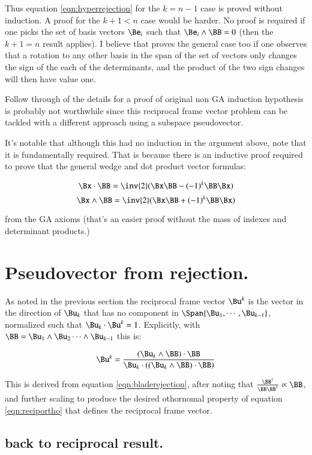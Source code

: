 \documentclass{article}      %
\begin{document}
Thus equation \ref{eqn:hyperrejection} for the $k = n-1$ case is proved without induction.  A proof for the $k+1<n$ case would be harder.
No proof is required if one picks the set of basis vectors ${\Be_i}$ such that $\Be_i \wedge \BB = 0$ (then the $k+1=n$ result applies).
I believe that proves the general case too if one observes that a rotation to any other basis in the span of the set of vectors only
changes the sign of the each of the determinants, and the product of the two sign changes will then have value one.

Follow through of the details for a proof of original non GA induction hypothesis is probably not worthwhile since this
reciprocal frame vector problem can be
tackled with a different approach using a subspace pseudovector.

It's notable that although this had no induction in the argument above, note that it is fundamentally required.
That is because there is an inductive proof
required to prove that the general wedge and dot product vector formulas:

\[
\Bx \cdot \BB = \inv{2}(\Bx \BB - (-1)^k\BB \Bx)
\]
\[
\Bx \wedge \BB = \inv{2}(\Bx \BB + (-1)^k\BB \Bx)
\]

from the GA axioms (that's an easier proof without the mass of indexes and determinant products.) 

\section{ Pseudovector from rejection. }

As noted in the previous section the reciprocal frame vector $\Bu^k$ is the vector in the direction of $\Bu_k$ that has no component
in $\Span{ \Bu_1, \cdots, \Bu_{k-1}}$, normalized such that $\Bu_k \cdot \Bu^k = 1$.  Explicitly, with
$\BB = \Bu_1 \wedge \Bu_2 \cdots \wedge \Bu_{k-1}$ this is:

\begin{equation}\label{eqn:reciprej}
\Bu^k = 
\frac
{
(\Bu_k \wedge \BB) \cdot \BB
}
{
\Bu_k \cdot \left((\Bu_k \wedge \BB) \cdot \BB\right)
}
\end{equation}

This is derived from equation \ref{eqn:bladerejection}, after noting that
$\frac{\BB^\dagger}{\BB\BB^\dagger} \propto \BB$, and further
scaling to produce the desired othornomal property of equation
\ref{eqn:reciportho}
that defines the reciprocal frame vector.

\subsection{ back to reciprocal result. }
\end{document}
